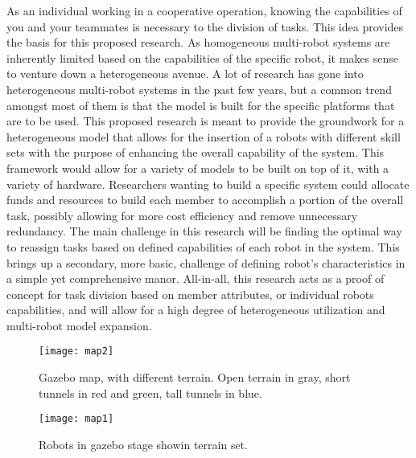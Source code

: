 As an individual working in a cooperative operation, knowing the capabilities
of you and your teammates is necessary to the division of tasks. This idea
provides the basis for this proposed research. As homogeneous multi-robot systems
are inherently limited based on the capabilities of the specific robot,
it makes sense to venture down a heterogeneous avenue. A lot of research
has gone into heterogeneous multi-robot systems in the past few years, but a
common trend amongst most of them is that the model is built for the specific
platforms that are to be used. This proposed research is meant to provide the
groundwork for a heterogeneous model that allows for the insertion of a
robots with different skill sets with the purpose of enhancing the overall
capability of the system. This framework would allow for a variety of models
to be built on top of it, with a variety of hardware. Researchers wanting to
build a specific system could allocate funds and resources to build each member
to accomplish a portion of the overall task, possibly allowing for more cost
efficiency and remove unnecessary redundancy. The main challenge in this
research will be finding the optimal way to reassign tasks based on defined
capabilities of each robot in the system. This brings up a secondary, more basic,
challenge of defining robot’s characteristics in a simple yet comprehensive manor.
All-in-all, this research acts as a proof of concept for task division based on member
attributes, or individual robots capabilities, and will allow for a high degree of
heterogeneous utilization and multi-robot model expansion.

\begin{figure}[H]
  \centering
    \texttt{[image: map2]}
  \caption{Gazebo map, with different terrain. Open terrain in gray, short tunnels in red and green, tall tunnels in blue.}
  \label{fig:map}
\end{figure}

\begin{figure}[H]
  \centering
    \texttt{[image: map1]}
  \caption{Robots in gazebo stage showin terrain set.}
  \label{fig:stage}
\end{figure}

